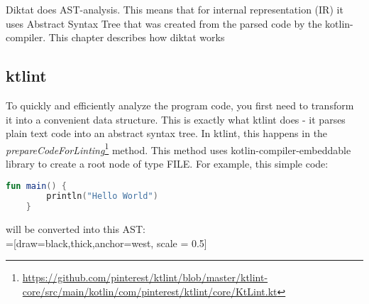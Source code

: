Diktat does AST-analysis. This means that for internal representation (IR) it uses Abstract Syntax Tree that was created from the parsed code by the kotlin-compiler.  This chapter describes how diktat works

\subsection{ktlint}
\par
To quickly and efficiently analyze the program code, you first need to transform it into a convenient data structure. This is exactly what ktlint does - it parses plain text code into an abstract syntax tree. In ktlint, this happens in the \textsl{prepareCodeForLinting}\footnote{\url{https://github.com/pinterest/ktlint/blob/master/ktlint-core/src/main/kotlin/com/pinterest/ktlint/core/KtLint.kt}} method. This method uses kotlin-compiler-embeddable library to create a root node of type FILE.
For example, this simple code:
\begin{lstlisting}[caption={Simple function.}, label={lst:example1}, language=Kotlin]
	fun main() {
		println("Hello World")
	}
\end{lstlisting}
will be converted into this AST:\\

=[draw=black,thick,anchor=west, scale = 0.5]
  
